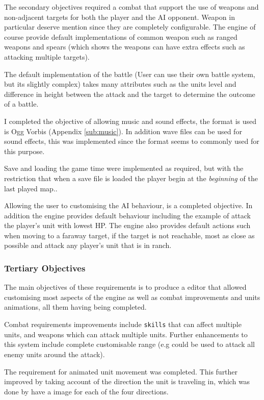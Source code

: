 The secondary objectives required a combat that support the use of weapons and non-adjacent targets for both the player and the AI opponent. Weapon in particular deserve  mention since they are completely configurable. The engine of course provide default implementations of common weapon such as ranged weapons and spears (which shows the weapons can have extra effects such as attacking multiple targets). 

The default implementation  of the battle (User can use their own battle system, but its slightly complex) takes many attributes such as the units level and difference in height between the attack and the target to determine the outcome of a battle. 

I completed the objective of allowing music and sound effects, the format is used is Ogg Vorbis (Appendix \ref{sub:music}). In addition wave files can be used for sound effects, this was implemented since the format seems to commonly used for this purpose.

Save and loading the game time were implemented as required, but with the restriction that when a save file is loaded the player begin at the \emph{beginning} of the last played map.. 

Allowing the user to customising the AI behaviour, is a completed objective. In addition the engine provides default behaviour including the example of attack the player's unit with lowest HP. The engine also provides default actions such when moving to a faraway target, if the target is not reachable, most as close as possible and attack any player's unit that is in ranch. 

\subsubsection{Tertiary Objectives}
The main objectives of these requirements is to produce a editor that allowed customising most aspects of the engine as well as combat improvements and units animations, all them having being completed. 

Combat requirements improvements include \texttt{skills} that can affect multiple units, and weapons which can attack multiple units. Further enhancements to this system include complete customisable range (e.g could be used to attack all enemy units around the attack).

The requirement for animated unit movement was completed. This further improved by taking account of the direction the unit is traveling in, which was done by have a  image for each of the four directions. 

